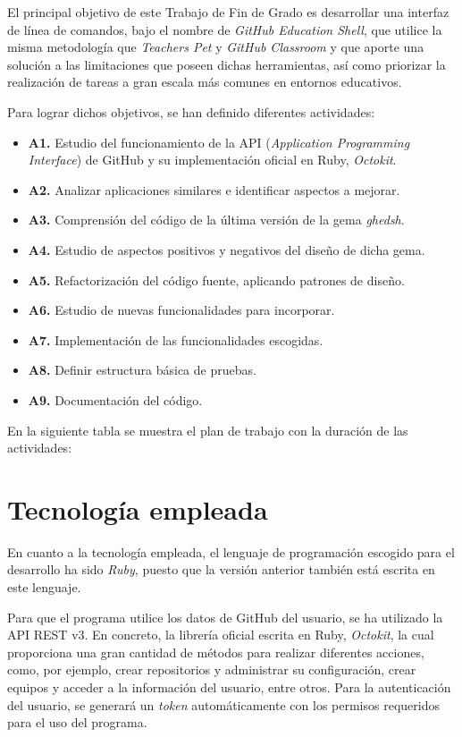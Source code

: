 El principal objetivo de este Trabajo de Fin de Grado es desarrollar una interfaz de línea de comandos, bajo el nombre de {\it GitHub Education Shell},
que utilice la misma metodología que {\it Teachers Pet} y {\it GitHub Classroom} y que aporte una solución a las limitaciones que poseen dichas herramientas, así como priorizar
la realización de tareas a gran escala más comunes en entornos educativos.
\bigskip

Para lograr dichos objetivos, se han definido diferentes actividades:
\begin{itemize}
  \item {\bf A1.} Estudio del funcionamiento de la API ({\it Application Programming Interface}) de GitHub y su implementación oficial en Ruby, {\it Octokit}.
  \item {\bf A2.} Analizar aplicaciones similares e identificar aspectos a mejorar.
  \item {\bf A3.} Comprensión del código de la última versión de la gema {\it ghedsh}.
  \item {\bf A4.} Estudio de aspectos positivos y negativos del diseño de dicha gema.
  \item {\bf A5.} Refactorización del código fuente, aplicando patrones de diseño.
  \item {\bf A6.} Estudio de nuevas funcionalidades para incorporar.
  \item {\bf A7.} Implementación de las funcionalidades escogidas.
  \item {\bf A8.} Definir estructura básica de pruebas.
  \item {\bf A9.} Documentación del código.
\end{itemize}
\bigskip

En la siguiente tabla se muestra el plan de trabajo con la duración de las actividades:


\section{Tecnología empleada}
\label{1:sec:4}
 
En cuanto a la tecnología empleada, el lenguaje de programación escogido para el desarrollo ha sido {\it Ruby},
puesto que la versión anterior también está escrita en este lenguaje.
\bigskip

Para que el programa utilice los datos de GitHub del usuario, se ha utilizado la API REST v3. En concreto,
la librería oficial escrita en Ruby, {\it Octokit}, la cual proporciona una gran cantidad de métodos para realizar diferentes acciones, como, por ejemplo,
crear repositorios y administrar su configuración, crear equipos y acceder a la información del usuario, entre otros.
Para la autenticación del usuario, se generará un {\it token} automáticamente con los permisos requeridos para el uso del programa.

